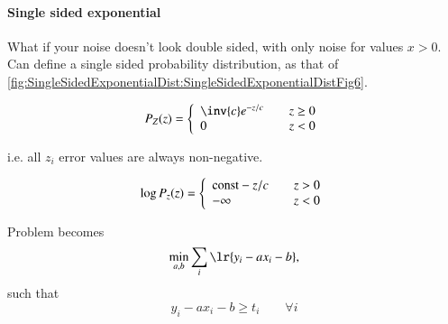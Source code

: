 \paragraph{Single sided exponential}
What if your noise doesn't look double sided, with only noise for values \( x > 0 \).  Can define a single sided probability distribution, as that of \cref{fig:SingleSidedExponentialDist:SingleSidedExponentialDistFig6}.

\begin{equation}\label{eqn:L1introduction:600}
P_Z(z) =
\left\{
\begin{array}{l l}
\inv{c} e^{-z/c} & \quad \mbox{\( z \ge 0 \)} \\
0 & \quad \mbox{\( z < 0 \)}
\end{array}
\right.
\end{equation}

i.e. all \( z_i \) error values are always non-negative.

\begin{equation}\label{eqn:L1introduction:620}
\log P_z(z) =
\left\{
\begin{array}{l l}
\textrm{const} - z/c & \quad \mbox{\( z > 0\)} \\
-\infty & \quad \mbox{\( z< 0\)}
\end{array}
\right.
\end{equation}

Problem becomes
\begin{equation}\label{eqn:L1introduction:640}
\min_{a, b} \sum_i \lr{ y_i - a x_i - b },
\end{equation}
such that
\begin{equation}\label{eqn:L1introduction:660}
y_i - a x_i - b \ge t_i \qquad \forall i
\end{equation}

